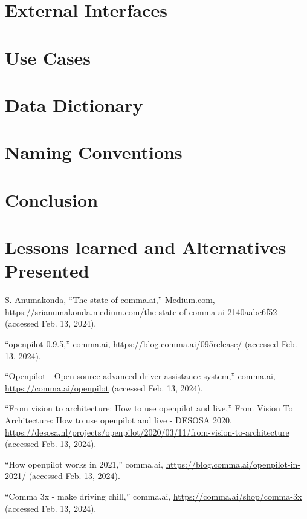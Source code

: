 \documentclass[12pt]{article}
\begin{document}
\section{External Interfaces}

\section{Use Cases}

\section{Data Dictionary}

\section{Naming Conventions}

\section{Conclusion}

\section{Lessons learned and Alternatives Presented}

\begin{thebibliography}{00}

     S. Anumakonda, “The state of comma.ai,” Medium.com, \url{https://srianumakonda.medium.com/the-state-of-comma-ai-2140aabc6f52} (accessed Feb. 13, 2024).

     “openpilot 0.9.5,” comma.ai, \url{https://blog.comma.ai/095release/} (accessed Feb. 13, 2024).

     “Openpilot - Open source advanced driver assistance system,” comma.ai, \url{https://comma.ai/openpilot} (accessed Feb. 13, 2024).

     “From vision to architecture: How to use openpilot and live,” From Vision To Architecture: How to use openpilot and live - DESOSA 2020, \url{https://desosa.nl/projects/openpilot/2020/03/11/from-vision-to-architecture} (accessed Feb. 13, 2024).

     “How openpilot works in 2021,” comma.ai, \url{https://blog.comma.ai/openpilot-in-2021/} (accessed Feb. 13, 2024). 

     “Comma 3x - make driving chill,” comma.ai, \url{https://comma.ai/shop/comma-3x} (accessed Feb. 13, 2024). 
\end{thebibliography}
\end{document}
